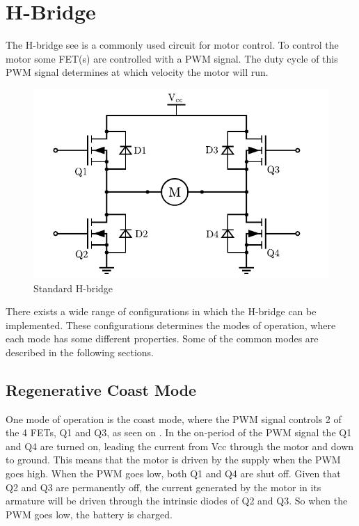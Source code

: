 \section{H-Bridge}
The H-bridge see  is a commonly used circuit for motor control. To control the motor some FET(s) are controlled with a PWM signal. The duty cycle of this PWM signal determines at which velocity the motor will run.

\begin{figure}[H]
	\centering
	\includegraphics[scale=.6]{figures/Hbridge.pdf}
	\caption{Standard H-bridge}
	\label{Hbridge}
\end{figure}

There exists a wide range of configurations in which the H-bridge can be implemented. These configurations determines the modes of operation, where each mode has some different properties. Some of the common modes are described in the following sections.

\subsection{Regenerative Coast Mode}
One mode of operation is the coast mode, where the PWM signal controls 2 of the 4 FETs, Q1 and Q3, as seen on . In the on-period of the PWM signal the Q1 and Q4 are turned on, leading the current from Vcc through the motor and down to ground. This means that the motor is driven by the supply when the PWM goes high. When the PWM goes low, both Q1 and Q4 are shut off. Given that Q2 and Q3 are permanently off, the current generated by the motor in its armature will be driven through the intrinsic diodes of Q2 and Q3. So when the PWM goes low, the battery is charged.

